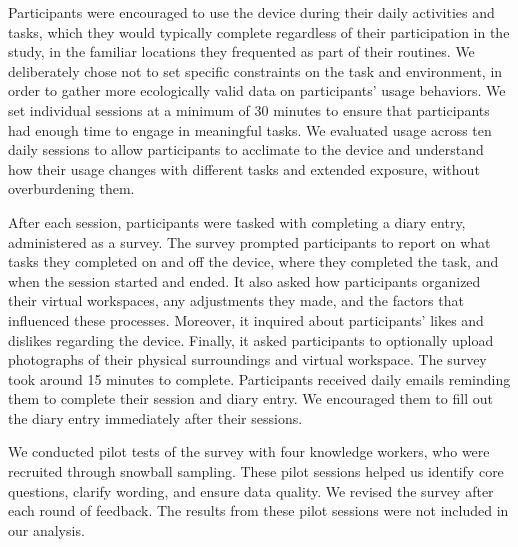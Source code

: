 Participants were encouraged to use the device during their daily activities and tasks, which they would typically complete regardless of their participation in the study, in the familiar locations they frequented as part of their routines.
We deliberately chose not to set specific constraints on the task and environment, in order to gather more ecologically valid data on participants' usage behaviors.
We set individual sessions at a minimum of 30 minutes to ensure that participants had enough time to engage in meaningful tasks.
We evaluated usage across ten daily sessions to allow participants to acclimate to the device and understand how their usage changes with different tasks and extended exposure, without overburdening them. 

After each session, participants were tasked with completing a diary entry, administered as a survey. 
The survey prompted participants to report on
what tasks they completed on and off the device, 
where they completed the task, 
and when the session started and ended.
It also asked how participants organized their virtual workspaces, any adjustments they made, and the factors that influenced these processes. 
Moreover, it inquired about participants' likes and dislikes regarding the device.
Finally, it asked participants to optionally upload photographs of their physical surroundings and virtual workspace.
The survey took around 15 minutes to complete. 
Participants received daily emails reminding them to complete their session and diary entry. 
We encouraged them to fill out the diary entry immediately after their sessions. 

We conducted pilot tests of the survey with four knowledge workers, who were recruited through snowball sampling. 
These pilot sessions helped us identify core questions, clarify wording, and ensure data quality. 
We revised the survey after each round of feedback. 
The results from these pilot sessions were not included in our analysis.

